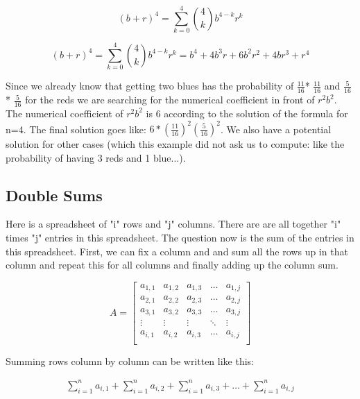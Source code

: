 \documentclass{article}
\begin{document}
\begin{equation*}
(b+r)^4 = \sum_{k=0}^{4} \binom{4}{k} b^{4-k} r^{k}
\end{equation*}

\begin{equation*}
(b+r)^4 = \sum_{k=0}^{4} \binom{4}{k} b^{4-k} r^{k} = b^4 + 4b^3r + 6b^2r^2 + 4br^3 + r^4
\end{equation*}

Since we already know that getting two blues has the probability of \(\frac{11}{16}\)* \(\frac{11}{16}\) and \(\frac{5}{16}\) * \(\frac{5}{16}\) for the reds we are searching for the numerical coefficient in front of \( r^2 b^2 \). The numerical coefficient of \( r^2 b^2 \) is 6 according to the solution of the formula for n=4. The final solution goes like: \(6* (\frac{11}{16})^2 (\frac{5}{16})^2 \). We also have a potential solution for other cases (which this example did not ask us to compute: like the probability of having 3 reds and 1 blue...).

\subsection{Double Sums}

Here is a spreadsheet of "i" rows and "j" columns. There are are all together "i" times "j" entries in this spreadsheet. The question now is the sum of the entries in this spreadsheet. First, we can fix a column and and sum all the rows up in that column and repeat this for all columns and finally adding up the column sum. 

\[
A = 
\begin{bmatrix}
a_{1,1} & a_{1,2} & a_{1,3} & \dots & a_{1,j} \\
a_{2,1} & a_{2,2} & a_{2,3} & \dots & a_{2,j} \\
a_{3,1} & a_{3,2} & a_{3,3} & \dots & a_{3,j} \\
\vdots & \vdots & \vdots & \ddots & \vdots \\
a_{i,1} & a_{i,2} & a_{i,3} & \dots & a_{i,j} \\
\end{bmatrix}
\]

Summing rows column by column can be written like this: 

\[
\begin{array}{cccccc}
\sum_{i=1}^n a_{i,1} + \sum_{i=1}^n a_{i,2} + \sum_{i=1}^n a_{i,3} + \dots + \sum_{i=1}^n a_{i,j} \\
\end{array}
\]
\end{document}

